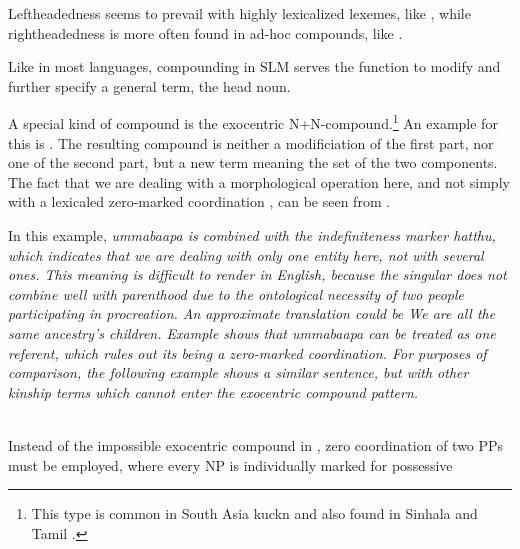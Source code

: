 Leftheadedness seems to prevail with highly lexicalized lexemes, like , while rightheadedness is more often found in ad-hoc compounds, like .

Like in most languages, compounding in SLM  serves the function to modify and further specify a general term, the head noun.



A special kind of compound is the exocentric N+N-compound.\footnote{This type is common in South Asia \citep{Abbi2001}kuckn and also found in Sinhala \citep[131]{Karunatillake2004} and Tamil \citep[96]{Arden1934}.} An example for this is . The resulting compound is neither a modificiation of the first part, nor one of the second part, but a new term meaning the set of the two components. The fact that we are dealing with a morphological operation here, and not simply with a lexicaled zero-marked coordination , can be seen from .



In this example, \em ummabaapa \em is combined with the indefiniteness marker \em hatthu\em, which indicates that we are dealing with only one entity here, not with several ones. This meaning is difficult to render in English, because the singular does not combine well with parenthood due to the ontological necessity of two people participating in procreation. An approximate translation could be \em We are all the same ancestry's children. \em Example  shows that \em ummabaapa \em can be treated as one referent, which rules out its being a zero-marked coordination. For purposes of comparison, the following example shows a similar sentence, but with other kinship terms which cannot enter the exocentric compound pattern.


 \\
Instead of the impossible exocentric compound in , zero coordination of two PPs must be employed, where every NP is individually marked for possessive

